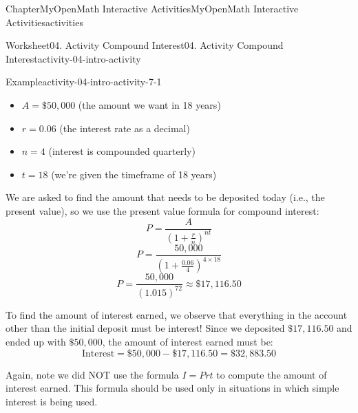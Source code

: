 \documentclass[oneside,10pt,]{book}
\newcommand{\blocktitlefont}{\relax}
\newcommand{\ptxlistdisc}{\raisebox{0.3ex}{\textbullet}}
\newlength{\fillinmaxwidth}
\newlength{\fillincontract}
\newlength{\charmaxwidth}\setlength{\charmaxwidth}{0.5em}
\newlength{\charminwidth}\setlength{\charminwidth}{0.1em}
\newlength{\fillinheight}
\newcommand{\fillintext}[1]{%
\setlength{\fillinmaxwidth}{#1\charmaxwidth}%
\setlength{\fillincontract}{#1\charminwidth}%
\setlength{\fillinheight}{\baselineskip}\addtolength{\fillinheight}{1.2pt}%
\strut\nobreak\leaders\vbox{\hrule width 0.3pt height 0.3pt \vskip -1.2pt}\hskip 1\fillinmaxwidth minus \fillincontract\nobreak\strut%
}
\begin{document}
\begin{chapterptx}{Chapter}{MyOpenMath Interactive Activities}{}{MyOpenMath Interactive Activities}{}{}{activities}
\begin{worksheet-section}{Worksheet}{04. Activity Compound Interest}{}{04. Activity Compound Interest}{}{}{activity-04-intro-activity}
\begin{example}{Example}{}{activity-04-intro-activity-7-1}
\begin{itemize}[label=\ptxlistdisc]
\item{}\(A = \$50,000\) (the amount we want in 18 years)%
\item{}\(r = 0.06\) (the interest rate as a decimal)%
\item{}\(n = 4\) (interest is compounded quarterly)%
\item{}\(t = 18\) (we're given the timeframe of 18 years)%
\end{itemize}
%
\par
We are asked to find the amount that needs to be deposited today (i.e., the present value), so we use the present value formula for compound interest:%
\begin{equation*}
P = \frac{A}{\left(1 + \frac{r}{n}\right)^{nt}}
\end{equation*}
%
\begin{equation*}
P = \frac{50,000}{\left(1 + \frac{0.06}{4}\right)^{4 \times 18}}
\end{equation*}
%
\begin{equation*}
P = \frac{50,000}{(1.015)^{72}} \approx \$17,116.50
\end{equation*}
%
\par
To find the amount of interest earned, we observe that everything in the account other than the initial deposit must be interest! Since we deposited \(\$17,116.50\) and ended up with \(\$50,000\), the amount of interest earned must be:%
\begin{equation*}
\text{Interest} = \$50,000 - \$17,116.50 = \$32,883.50
\end{equation*}
%
\par
Again, note we did NOT use the formula \(I = Prt\) to compute the amount of interest earned. This formula should be used only in situations in which simple interest is being used.%
\end{example}
\end{worksheet-section}
\end{chapterptx}
\end{document}
